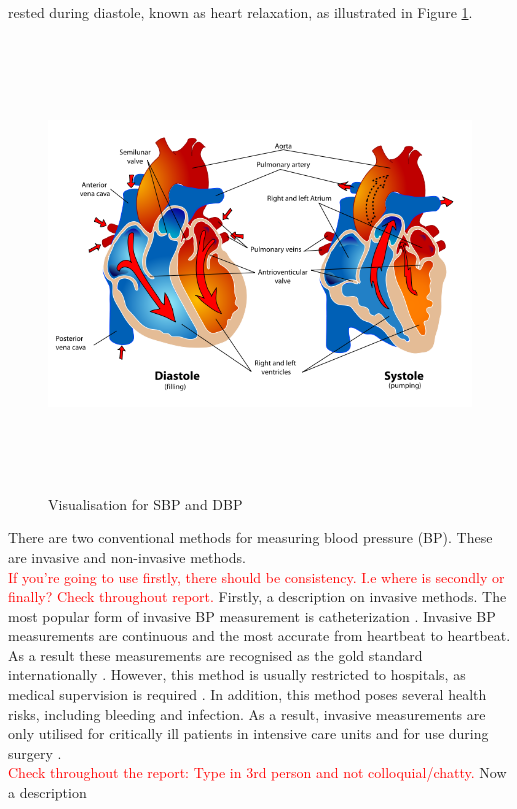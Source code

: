 rested during  diastole, known as heart  relaxation, as illustrated in Figure \ref{diastoleSystole}. \begin{figure}[H]
    \centering
    \includegraphics[width=12cm,height=12cm,keepaspectratio]{Background/sbp_dbp.png}
    \caption{Visualisation for SBP and DBP \cite{SBP}}
    \label{diastoleSystole}
\end{figure} \noindent There 
are two  conventional  methods  for  measuring  blood  pressure (BP). These 
are invasive   and   non-invasive methods. \\ \newline \noindent \textcolor{red}{If you're going to use firstly, there should be consistency. I.e where is secondly or finally? Check throughout report.}
Firstly, a description on invasive methods. The most popular form of invasive  BP 
measurement is  catheterization \cite{Zaki2018}. Invasive BP measurements 
are continuous and the most accurate from heartbeat to heartbeat. As a result 
these measurements are recognised as the gold standard 
internationally \cite{Sharma2017} \cite{ElHajj2020}. However, this method is 
usually restricted to hospitals, as medical supervision is required \cite{Pradenas2020}. 
In addition, this method poses several health risks, including bleeding and 
infection. As a result, invasive measurements are only utilised for critically 
ill patients in intensive care units and for use during 
surgery \cite{Zaki2018}\cite{ElHajj2020}. \\ \newline \noindent \textcolor{red}{Check throughout the report: Type in 3rd person and not colloquial/chatty.} Now a description 

